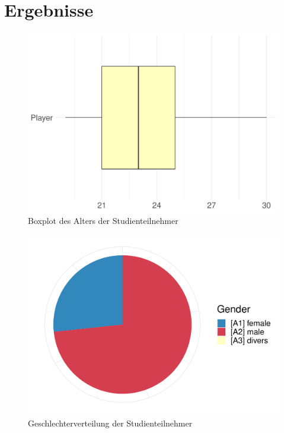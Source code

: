 \section{Ergebnisse}

\begin{figure}
	\includegraphics[width=\textwidth]{./appendices/age}
	\caption{Boxplot des Alters der Studienteilnehmer}
	\label{fig:age}
\end{figure}

\begin{figure}
	\includegraphics[width=\textwidth]{./appendices/gender}
	\caption{Geschlechterverteilung der Studienteilnehmer}
	\label{fig:gender}
\end{figure}

